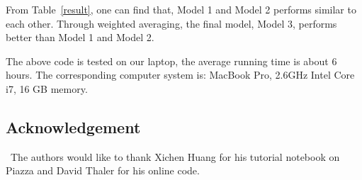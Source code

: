 \documentclass[12pt]{article}
\begin{document}
From Table~\ref{result}, one can find that, Model 1 and Model 2 performs similar to each other. Through weighted averaging, the final model, Model 3, performs better than Model 1 and Model 2.

The above code is tested on our laptop, the average running time is about 6 hours. The corresponding computer system is:
MacBook Pro, 2.6GHz Intel Core i7, 16 GB memory.  

\subsection*{Acknowledgement}


\quad\ The authors would like to thank Xichen Huang for his tutorial notebook on Piazza and David Thaler for his online code.

\vfill\pagebreak

%
\end{document}
